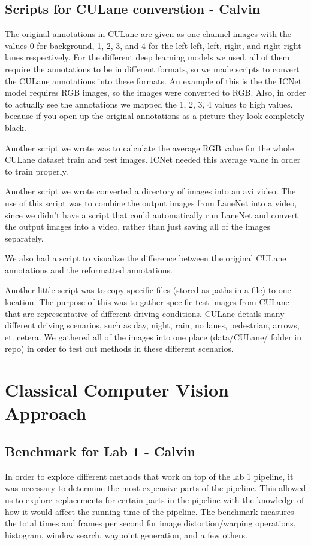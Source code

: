 \documentclass[twoside,twocolumn]{article}
\begin{document}
\subsection{Scripts for CULane converstion - Calvin}
\par The original annotations in CULane are given as one channel images with the values 0 for background, 1, 2, 3, and 4 for the left-left, left, right, and right-right lanes respectively. For the different deep learning models we used, all of them require the annotations to be in different formats, so we made scripts to convert the CULane annotations into these formats. An example of this is the the ICNet model requires RGB images, so the images were converted to RGB. Also, in order to actually see the annotations we mapped the 1, 2, 3, 4 values to high values, because if you open up the original annotations as a picture they look completely black.
\par Another script we wrote was to calculate the average RGB value for the whole CULane dataset train and test images. ICNet needed this average value in order to train properly.
\par Another script we wrote converted a directory of images into an avi video. The use of this script was to combine the output images from LaneNet into a video, since we didn't have a script that could automatically run LaneNet and convert the output images into a video, rather than just saving all of the images separately.
\par We also had a script to visualize the difference between the original CULane annotations and the reformatted annotations.
\par Another little script was to copy specific files (stored as paths in a file) to one location. The purpose of this was to gather specific test images from CULane that are representative of different driving conditions. CULane details many different driving scenarios, such as day, night, rain, no lanes, pedestrian, arrows, et. cetera. We gathered all of the images into one place (data/CULane/ folder in repo) in order to test out methods in these different scenarios.



\section{Classical Computer Vision Approach}

\subsection{Benchmark for Lab 1 - Calvin}
\par In order to explore different methods that work on top of the lab 1 pipeline, it was necessary to determine the most expensive parts of the pipeline. This allowed us to explore replacements for certain parts in the pipeline with the knowledge of how it would affect the running time of the pipeline. The benchmark measures the total times and frames per second for image distortion/warping operations, histogram, window search, waypoint generation, and a few others.
\end{document}
